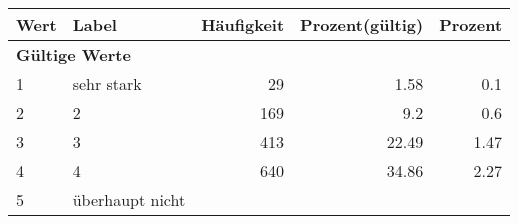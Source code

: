      \begin{longtable}{lXrrr}
     \toprule
     \textbf{Wert} & \textbf{Label} & \textbf{Häufigkeit} & \textbf{Prozent(gültig)} & \textbf{Prozent} \\
     \endhead
     \midrule
     \multicolumn{5}{l}{\textbf{Gültige Werte}}\\

     1 &
     \multicolumn{1}{X}{ sehr stark   } &


       \num{29} &
       \num[round-mode=places,round-precision=2]{1.58} &
         \num[round-mode=places,round-precision=2]{0.1} \\

     2 &
     \multicolumn{1}{X}{ 2   } &


       \num{169} &
       \num[round-mode=places,round-precision=2]{9.2} &
         \num[round-mode=places,round-precision=2]{0.6} \\

     3 &
     \multicolumn{1}{X}{ 3   } &


       \num{413} &
       \num[round-mode=places,round-precision=2]{22.49} &
         \num[round-mode=places,round-precision=2]{1.47} \\

     4 &
     \multicolumn{1}{X}{ 4   } &


       \num{640} &
       \num[round-mode=places,round-precision=2]{34.86} &
         \num[round-mode=places,round-precision=2]{2.27} \\

     5 &
     \multicolumn{1}{X}{ überhaupt nicht   } &



\end{longtable}
